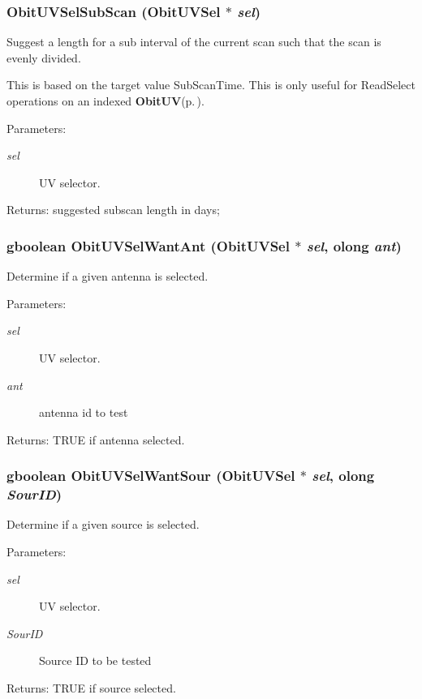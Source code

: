 \subsubsection{ Obit\-UVSel\-Sub\-Scan ({\bf Obit\-UVSel} $\ast$ {\em sel})}\label{ObitUVSel_8h_a18}


Suggest a length for a sub interval of the current scan such that the scan is evenly divided. 

This is based on the target value Sub\-Scan\-Time. This is only useful for Read\-Select operations on an indexed {\bf Obit\-UV}{\rm (p.\,\pageref{structObitUV})}. \begin{Desc}
\item[Parameters:]
\begin{description}
\item[{\em sel}]UV selector. \end{description}
\end{Desc}
\begin{Desc}
\item[Returns:]suggested subscan length in days; \end{Desc}
\subsubsection{\setlength{\rightskip}{0pt plus 5cm}gboolean Obit\-UVSel\-Want\-Ant ({\bf Obit\-UVSel} $\ast$ {\em sel}, {\bf olong} {\em ant})}\label{ObitUVSel_8h_a17}


Determine if a given antenna is selected. 

\begin{Desc}
\item[Parameters:]
\begin{description}
\item[{\em sel}]UV selector. \item[{\em ant}]antenna id to test \end{description}
\end{Desc}
\begin{Desc}
\item[Returns:]TRUE if antenna selected. \end{Desc}
\subsubsection{\setlength{\rightskip}{0pt plus 5cm}gboolean Obit\-UVSel\-Want\-Sour ({\bf Obit\-UVSel} $\ast$ {\em sel}, {\bf olong} {\em Sour\-ID})}\label{ObitUVSel_8h_a16}


Determine if a given source is selected. 

\begin{Desc}
\item[Parameters:]
\begin{description}
\item[{\em sel}]UV selector. \item[{\em Sour\-ID}]Source ID to be tested \end{description}
\end{Desc}
\begin{Desc}
\item[Returns:]TRUE if source selected. \end{Desc}

